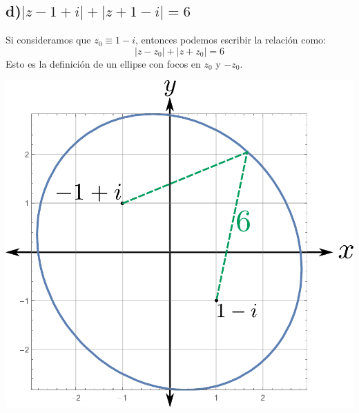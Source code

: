 \documentclass{article}
\begin{document}
\subsection*{d)$|z-1+i|+|z+1-i|=6$}
Si consideramos que $z_0\equiv 1-i$, entonces podemos escribir la relación como:
$$|z-z_0|+|z+z_0|=6$$
Esto es la definición de un ellipse con focos en $z_0$ y $-z_0$. 
\begin{center}
\includegraphics[scale=0.5]{fig5.pdf}
\end{center}
\end{document}
